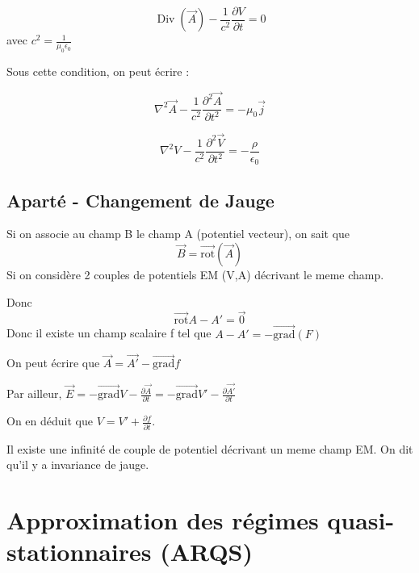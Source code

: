 \documentclass[french]{yLectureNote}
\renewcommand{\vec}{\overrightarrow}
\newcommand{\dd}{\mathrm{d}}
\newcommand{\lap}{\nabla^2}
\DeclareMathOperator{\Div}{Div}
\newcommand{\rot}{\vec{\mathrm{rot}}}
\newcommand{\grad}{\vec{\mathrm{grad}}}
\begin{document}
\begin{theorem}
    $$\Div(\vec{A}) - \frac{1}{c^2}\frac{\partial V}{\partial t}=0$$ avec $c^2 = \frac{1}{\mu_0\epsilon_0}$
\end{theorem}
Sous cette condition, on peut écrire :
\begin{theorem}
   $$\lap \vec{A} - \frac{1}{c^2} \frac{\partial^2\vec{A}}{\partial t^2}=-\mu_0 \vec{j}$$ 
\end{theorem}
\begin{theorem}
   $$\lap V - \frac{1}{c^2} \frac{\partial^2\vec{V}}{\partial t^2}=-\frac{\rho}{\epsilon_0}$$ 
\end{theorem}
\subsection{Aparté -  Changement de Jauge} 
Si on associe au champ B le champ A (potentiel vecteur), on sait que
$$\vec{B} = \rot(\vec{A})$$
Si on considère 2 couples de potentiels EM (V,A) décrivant le meme champ.

Donc $$\rot{A-A'} = \vec{0}$$
Donc il existe un champ scalaire f tel que $A-A'=-\grad(F)$

On peut écrire que $\vec{A}=\vec{A'}-\grad{f}$

Par ailleur, $\vec{E} = -\grad{V}-\frac{\partial \vec{A}}{\partial t} =  -\grad{V'}-\frac{\partial \vec{A'}}{\partial t}$

On en déduit que $V = V'+\frac{\partial f}{\partial t}$.

Il existe une infinité de couple de potentiel  décrivant un meme champ EM. On dit qu'il y a invariance de jauge.
\section{Approximation des régimes quasi-stationnaires (ARQS)}
\end{document}
